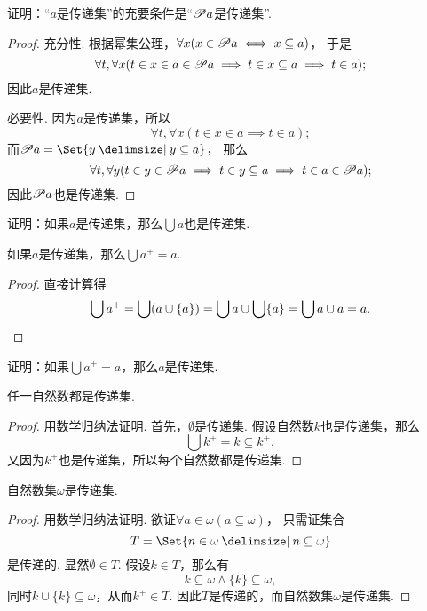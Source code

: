 \begin{example}
证明：“\(a\)是传递集”的充要条件是“\(\mathscr{P} a\)是传递集”.
\begin{proof}
充分性.
根据幂集公理，\(\forall x(x \in \mathscr{P} a \iff x \subseteq a)\)，%
于是\[
\forall t, \forall x
(t \in x \in a \in \mathscr{P} a
\implies t \in x \subseteq a
\implies t \in a);
\]因此\(a\)是传递集.

必要性.
因为\(a\)是传递集，所以\[
\forall t, \forall x
(t \in x \in a \implies t \in a);
\]
而\(\Powerset a = \Set{ y \given y \subseteq a }\)，%
那么\[
\forall t, \forall y
(t \in y \in \mathscr{P} a
\implies t \in y \subseteq a
\implies t \in a \in \mathscr{P} a);
\]
因此\(\mathscr{P} a\)也是传递集.
\end{proof}
\end{example}

\begin{example}
证明：如果\(a\)是传递集，那么\(\bigcup a\)也是传递集.
\end{example}

\begin{theorem}
如果\(a\)是传递集，那么\(\bigcup a^+ = a\).
\begin{proof}
直接计算得\[
\bigcup a^+
= \bigcup (a \cup \{a\})
= \bigcup a \cup \bigcup\{a\}
= \bigcup a \cup a
= a.
\qedhere
\]
\end{proof}
\end{theorem}

\begin{example}
证明：如果\(\bigcup a^+ = a\)，那么\(a\)是传递集.
\end{example}

\begin{theorem}
任一自然数都是传递集.
\begin{proof}
用数学归纳法证明.
首先，\(\emptyset\)是传递集.
假设自然数\(k\)也是传递集，那么\[
\bigcup k^+ = k \subseteq k^+,
\]又因为\(k^+\)也是传递集，所以每个自然数都是传递集.
\end{proof}
\end{theorem}

\begin{theorem}
自然数集\(\omega\)是传递集.
\begin{proof}
用数学归纳法证明.
欲证\(\forall a \in \omega ( a \subseteq \omega )\)，%
只需证集合\[
T = \Set{n \in \omega \given n \subseteq \omega}
\]是传递的.
显然\(\emptyset \in T\).
假设\(k \in T\)，那么有\[
k \subseteq \omega
\land
\{k\} \subseteq \omega,
\]同时\(k \cup \{k\} \subseteq \omega\)，从而\(k^+ \in T\).
因此\(T\)是传递的，而自然数集\(\omega\)是传递集.
\end{proof}
\end{theorem}


